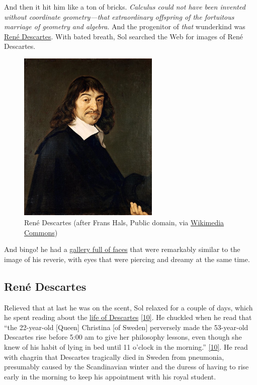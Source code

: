 \documentclass[
  a4paper,
]{article}
\begin{document}
And then it hit him like a ton of bricks. \emph{Calculus could not have
been invented without coordinate geometry---that extraordinary offspring
of the fortuitous marriage of geometry and algebra}. And the progenitor
of \emph{that} wunderkind was
\href{https://en.wikipedia.org/wiki/Ren\%C3\%A9_Descartes}{René
Descartes}. With bated breath, Sol searched the Web for images of René
Descartes.

\begin{figure}
\centering
\includegraphics[width=0.6\textwidth,height=\textheight]{images/rene-descartes.jpg}
\caption{René Descartes (after Frans Hals, Public domain, via
\href{https://commons.wikimedia.org/wiki/File:Frans_Hals_-_Portret_van_Ren\%C3\%A9_Descartes.jpg}{Wikimedia
Commons})}
\end{figure}

And bingo! he had a \href{https://tinyurl.com/y57nykjd}{gallery full of
faces} that were remarkably similar to the image of his reverie, with
eyes that were piercing and dreamy at the same time.

\hypertarget{renuxe9-descartes}{%
\subsection{René Descartes}\label{renuxe9-descartes}}

Relieved that at last he was on the scent, Sol relaxed for a couple of
days, which he spent reading about the
\href{https://www.britannica.com/biography/Rene-Descartes}{life of
Descartes} \protect\hyperlink{ref-watson2020}{{[}10{]}}. He chuckled
when he read that ``the 22-year-old {[}Queen{]} Christina {[}of
Sweden{]} perversely made the 53-year-old Descartes rise before 5:00 am
to give her philosophy lessons, even though she knew of his habit of
lying in bed until 11 o'clock in the morning.''
\protect\hyperlink{ref-watson2020}{{[}10{]}}. He read with chagrin that
Descartes tragically died in Sweden from pneumonia, presumably caused by
the Scandinavian winter and the duress of having to rise early in the
morning to keep his appointment with his royal student.
\end{document}
